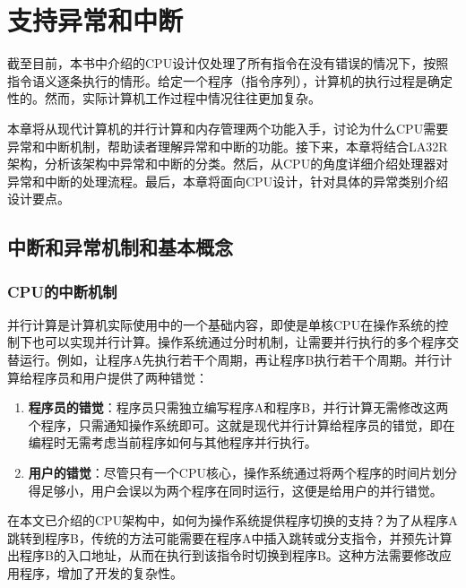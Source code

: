 
\chapter{支持异常和中断}\label{chap:07-exceptions}

截至目前，本书中介绍的CPU设计仅处理了所有指令在没有错误的情况下，按照指令语义逐条执行的情形。给定一个程序（指令序列），计算机的执行过程是确定性的。然而，实际计算机工作过程中情况往往更加复杂。

本章将从现代计算机的并行计算和内存管理两个功能入手，讨论为什么CPU需要异常和中断机制，帮助读者理解异常和中断的功能。接下来，本章将结合LA32R架构，分析该架构中异常和中断的分类。然后，从CPU的角度详细介绍处理器对异常和中断的处理流程。最后，本章将面向CPU设计，针对具体的异常类别介绍设计要点。

\section{中断和异常机制和基本概念}\label{sec:07-exceptions-001}

\subsection{CPU的中断机制}\label{sec:07-exceptions-002}

并行计算是计算机实际使用中的一个基础内容，即使是单核CPU在操作系统的控制下也可以实现并行计算。操作系统通过分时机制，让需要并行执行的多个程序交替运行。例如，让程序A先执行若干个周期，再让程序B执行若干个周期。并行计算给程序员和用户提供了两种错觉：

\begin{enumerate}
\def\labelenumi{\arabic{enumi}.}
\item
  \textbf{程序员的错觉}：程序员只需独立编写程序A和程序B，并行计算无需修改这两个程序，只需通知操作系统即可。这就是现代并行计算给程序员的错觉，即在编程时无需考虑当前程序如何与其他程序并行执行。
\item
  \textbf{用户的错觉}：尽管只有一个CPU核心，操作系统通过将两个程序的时间片划分得足够小，用户会误以为两个程序在同时运行，这便是给用户的并行错觉。
\end{enumerate}

在本文已介绍的CPU架构中，如何为操作系统提供程序切换的支持？为了从程序A跳转到程序B，传统的方法可能需要在程序A中插入跳转或分支指令，并预先计算出程序B的入口地址，从而在执行到该指令时切换到程序B。这种方法需要修改应用程序，增加了开发的复杂性。


